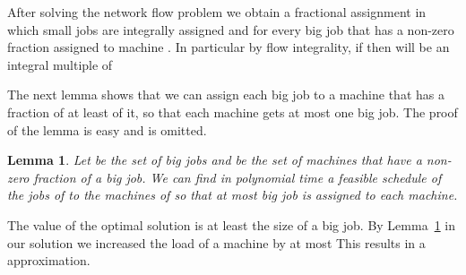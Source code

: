 \documentclass[11pt]{article}\usepackage{amsmath}
\newtheorem{lemma}{Lemma}[section]
\newenvironment{proof}{\noindent{\bf Proof.}}{  \rule{2mm}{3mm}}
\begin{document}
After  solving  the  network  flow  problem  we  obtain  a  fractional
assignment  in which small jobs are integrally assigned and for  every big job
 that has a non-zero fraction  assigned to machine
 . In particular by flow integrality, if
 then  will be an integral multiple of 

The next lemma shows that we can assign each big job to a machine that
has a fraction of  at least  of it, so that  each machine gets at
most one big job. 
The  proof of the lemma is easy and is omitted. 

\begin{lemma} \label{lemma:easy} 
Let  be the  set of big jobs and  be  the set of machines
that have a non-zero fraction of  a big job. We can find in polynomial
time a feasible schedule of the jobs of  to the machines of  
so that at most  big job is assigned to each machine.
\end{lemma}

\iffalse =========== omit proof ==================
\begin{proof}
We form  the following  bipartite graph   : on  one side
 of  we have one node for each big job , and on the
other side  we have one node for each machine . The
set of edges  is defined as  follows. We have an edge from each big
job node to each machine node  iff the corresponding machine has a non
zero fraction  of that job. Now let  us consider a set  of nodes   and let   be the  set of
neighbor nodes of  , that is   is exactly the set
of  nodes that are  connected to  some node  of .  Then . Let  assume otherwise  that . Since  our network solution  sends  units of  flow through
any node that corresponds to a big job , the total fractions of 
that are assigned to machines  in our fractional assignment  sum up
to .  Thus the  total fraction of  the big  jobs in   that is
assigned  to  the  machines  of    is  .  Since
 there  is at  least one  machine  that is
assigned a total fraction of big jobs greater than , which violates
the property of our fractional assignment discussed above.

Thus the conditions  of Hall's theorem for bipartite  matching hold, so
we  can in  polynomial time  find such  an assignment  of big  jobs to
machines, with each machine getting at most one big job.
\end{proof}
================= End omit proof ============ \fi 

The value of the optimal solution is at least 
the size of a big job. By Lemma~\ref{lemma:easy} 
in our solution we increased the load of a
machine by at most  This results in a  approximation.
\end{document}
